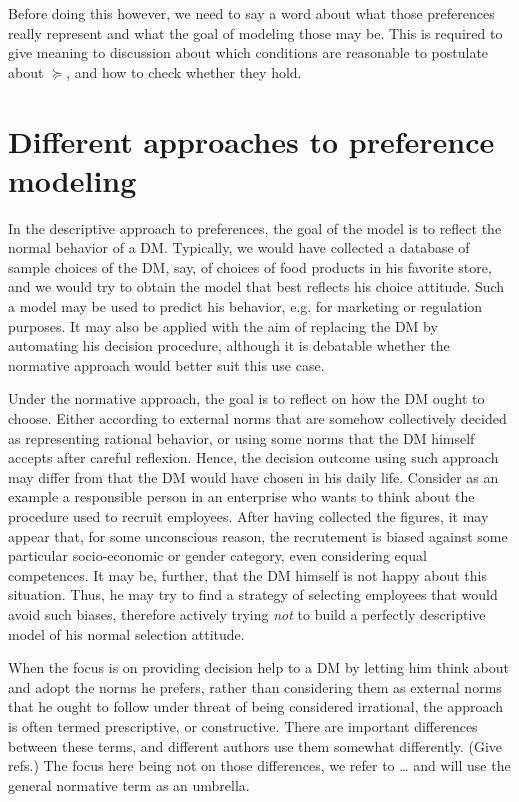\documentclass[french, english]{llncs}
\begin{document}
Before doing this however, we need to say a word about what those preferences really represent and what the goal of modeling those may be. This is required to give meaning to discussion about which conditions are reasonable to postulate about $\succeq$, and how to check whether they hold.

\section{Different approaches to preference modeling}
In the descriptive approach to preferences, the goal of the model is to reflect the normal behavior of a \ac{DM}. Typically, we would have collected a database of sample choices of the \ac{DM}, say, of choices of food products in his favorite store, and we would try to obtain the model that best reflects his choice attitude. Such a model may be used to predict his behavior, e.g. for marketing or regulation purposes. It may also be applied with the aim of replacing the \ac{DM} by automating his decision procedure, although it is debatable whether the normative approach would better suit this use case.

Under the normative approach, the goal is to reflect on how the \ac{DM} ought to choose. Either according to external norms that are somehow collectively decided as representing rational behavior, or using some norms that the \ac{DM} himself accepts after careful reflexion. Hence, the decision outcome using such approach may differ from that the \ac{DM} would have chosen in his daily life. Consider as an example a responsible person in an enterprise who wants to think about the procedure used to recruit employees. After having collected the figures, it may appear that, for some unconscious reason, the recrutement is biased against some particular socio-economic or gender category, even considering equal competences. It may be, further, that the \ac{DM} himself is not happy about this situation. Thus, he may try to find a strategy of selecting employees that would avoid such biases, therefore actively trying \emph{not} to build a perfectly descriptive model of his normal selection attitude.

When the focus is on providing decision help to a \ac{DM} by letting him think about and adopt the norms he prefers, rather than considering them as external norms that he ought to follow under threat of being considered irrational, the approach is often termed prescriptive, or constructive. There are important differences between these terms, and different authors use them somewhat differently. (Give refs.) The focus here being not on those differences, we refer to … and will use the general normative term as an umbrella.
\end{document}
